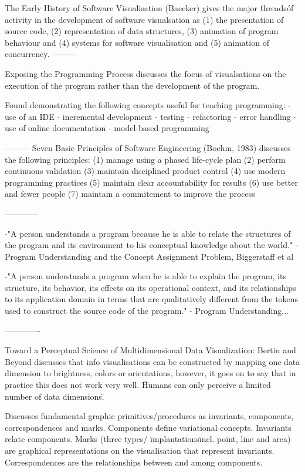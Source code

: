The Early History of Software Visualisation (Baecker) gives the major \'threads\' of activity in the development of software visualsation as (1) the presentation of source code, (2) representation of data structures, (3) animation of program behaviour and (4) systems for software visualisation and (5) animation of concurrency.
---------

Exposing the Programming Process discusses the focus of visualsations on the execution of the program rather than the development of the program.

Found demonstrating the following concepts useful for teaching programming:
- use of an IDE
- incremental development
- testing
- refactoring
- error handling
- use of online documentation
- model-based programming

---------
Seven Basic Principles of Software Engineering (Boehm, 1983) discusses the following principles:
(1) manage using a phased life-cycle plan
(2) perform continuous validation
(3) maintain disciplined product control
(4) use modern programming practices
(5) maintain clear accountability for results
(6) use better and fewer people
(7) maintain a commitement to improve the process

------------

-"A person understands a program because he is able to relate the structures of the program and its environment to his conceptual knowledge about the world." - Program Understanding and the Concept Assignment Problem, Biggerstaff et al

-"A person understands a program when he is able to explain the program, its structure, its behavior, its effects on its operational context, and its relationships to its application domain in terms that are qualitatively different from the tokens used to construct the source code of the program." - Program Understanding...

-------------

Toward a Perceptual Science of Multidimensional Data Visualization: Bertin and Beyond discusses that info visualisations can be constructed by mapping one data dimension to brightness, colors or orientations, however, it goes on to say that in practice this does not work very well. \"Humans can only perceive a limited number of data dimensions\".

Discusses fundamental graphic primitives/procedures as invariants, components, correspondences and marks. Components define variational concepts. Invariants relate components. Marks (three types/ \"implantations\" incl. point, line and area) are graphical representations on the visualisation that represent invariants. Correspondences are the relationships between and among components.

